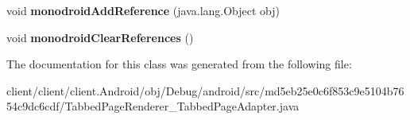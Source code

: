 \begin{DoxyCompactItemize}
\item 
\hypertarget{classmd5eb25e0c6f853c9e5104b7654c9dc6cdf_1_1TabbedPageRenderer__TabbedPageAdapter_a0aa9db3fa8c3c5fede1e6a703b1c7454}{}void {\bfseries monodroid\+Add\+Reference} (java.\+lang.\+Object obj)\label{classmd5eb25e0c6f853c9e5104b7654c9dc6cdf_1_1TabbedPageRenderer__TabbedPageAdapter_a0aa9db3fa8c3c5fede1e6a703b1c7454}

\item 
\hypertarget{classmd5eb25e0c6f853c9e5104b7654c9dc6cdf_1_1TabbedPageRenderer__TabbedPageAdapter_ad207c2e0134ebef45827c7b233e58607}{}void {\bfseries monodroid\+Clear\+References} ()\label{classmd5eb25e0c6f853c9e5104b7654c9dc6cdf_1_1TabbedPageRenderer__TabbedPageAdapter_ad207c2e0134ebef45827c7b233e58607}

\end{DoxyCompactItemize}


The documentation for this class was generated from the following file\+:\begin{DoxyCompactItemize}
\item 
client/client/client.\+Android/obj/\+Debug/android/src/md5eb25e0c6f853c9e5104b7654c9dc6cdf/Tabbed\+Page\+Renderer\+\_\+\+Tabbed\+Page\+Adapter.\+java\end{DoxyCompactItemize}

